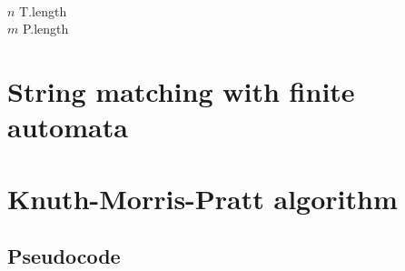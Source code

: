 \documentclass[11pt]{article}
\begin{document}
        \begin{algorithm}[H] \label{alg:naive_string_matching_algorithm}
        \SetAlgoLined
        \vspace{0.5em}
         \\
        \vspace{0.5em}

            $n$ \leftarrow T.length\; \\
            $m$ \leftarrow P.length\; \\

        \end{algorithm}

    \section{String matching with finite automata} \label{sec:string_matching_with_finite_automata}



    \section{Knuth-Morris-Pratt algorithm} \label{sec:knuth_morris_pratt_algorithm}

        \subsection{Pseudocode} \label{subsec:kmp_pseudocode}
\end{document}
